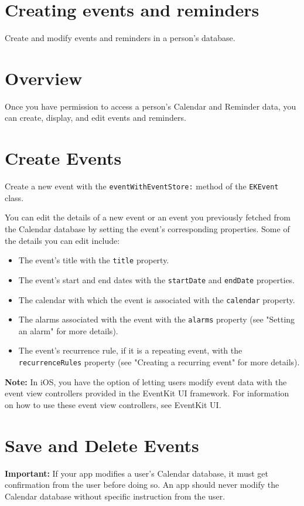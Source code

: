 \documentclass{article}
\title{}
\author{}
\date{}
\begin{document}
\section*{Creating events and reminders}
Create and modify events and reminders in a person's database.

\section*{Overview}
Once you have permission to access a person's Calendar and Reminder data, you can create, display, and edit events and reminders.

\section*{Create Events}
Create a new event with the \texttt{eventWithEventStore:} method of the \texttt{EKEvent} class.

You can edit the details of a new event or an event you previously fetched from the Calendar database by setting the event's corresponding properties. Some of the details you can edit include:
\begin{itemize}
    \item The event's title with the \texttt{title} property.
    \item The event's start and end dates with the \texttt{startDate} and \texttt{endDate} properties.
    \item The calendar with which the event is associated with the \texttt{calendar} property.
    \item The alarms associated with the event with the \texttt{alarms} property (see "Setting an alarm" for more details).
    \item The event's recurrence rule, if it is a repeating event, with the \texttt{recurrenceRules} property (see "Creating a recurring event" for more details).
\end{itemize}

\textbf{Note:} In iOS, you have the option of letting users modify event data with the event view controllers provided in the EventKit UI framework. For information on how to use these event view controllers, see EventKit UI.

\section*{Save and Delete Events}
\textbf{Important:} If your app modifies a user's Calendar database, it must get confirmation from the user before doing so. An app should never modify the Calendar database without specific instruction from the user.
\end{document}
